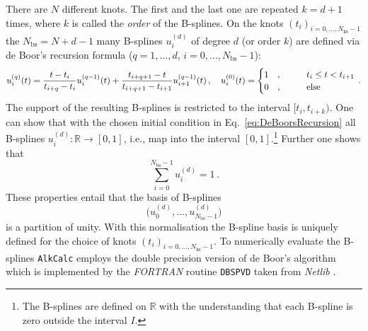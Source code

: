\documentclass[fontsize=12pt,
               twoside=false,
               BCOR=0mm,
               DIV=14,
               overfullrule=false, %
               toc=bibliography,
               headinclude=true,
               footinclude=false]{scrartcl}
\numberwithin{equation}{section}
\newcommand{\alkcalc}{\texttt{AlkCalc} }
\begin{document}
    There are $N$ different knots. The first and the last one are repeated
    $k=d+1$ times, where $k$ is called the \emph{order} of the B-splines. On the
    knots $(t_i)_{i=0,\dots,N_\mathrm{ks}-1}$ the $N_\mathrm{bs}=N+d-1$ many
    B-splines $u^{(d)}_i$ of degree $d$ (or order $k$) are defined via de Boor's
    recursion formula \cite{deboor2001} ($q=1,\dots,d$,
    $i=0,\dots,N_\mathrm{bs}-1$):
    \begin{equation}\label{eq:DeBoorsRecursion}
        u^{(q)}_i(t)
        =
        \frac{t-t_i}{t_{i+q}-t_i}
        u^{(q-1)}_i(t)
        +
        \frac{t_{i+q+1}-t}{t_{i+q+1}-t_{i+1}}
        u^{(q-1)}_{i+1}(t)
    \,, \ \ \
        u^{(0)}_i(t)
        =
        \begin{cases}
            1
            &, \hspace*{10mm} t_i \leq t < t_{i+1}
        \\
            0
            &, \hspace*{10mm} \text{else}
        \end{cases}
    \,.
    \end{equation}
    The support of the resulting B-splines is restricted to the interval
    $[t_i,t_{i+k})$. One can show that with the chosen initial condition in
    Eq.~\eqref{eq:DeBoorsRecursion} all B-splines
    $u^{(d)}_i\colon\mathbb{R}\to[0,1]$, i.e., map into the interval
    $[0,1]$.\footnote{The B-splines are defined on $\mathbb{R}$ with the
    understanding that each B-spline is zero outside the interval $I$.} Further
    one shows that
    \begin{equation}
        \sum^{N_\mathrm{bs}-1}_{i=0} u^{(d)}_i = 1
    \,.
    \end{equation}
    These properties entail that the basis of B-splines
    \begin{equation}
        \big(
            u^{(d)}_0, \dots, u^{(d)}_{N_\mathrm{bs}-1}
        \big)
    \end{equation}
    is a partition of unity. With this normalisation the B-spline basis is
    uniquely defined for the choice of knots
    $(t_i)_{i=0,\dots,N_\mathrm{ks}-1}$. To numerically evaluate the B-splines
    \alkcalc employs the double precision version of de Boor's algorithm which
    is implemented by the \emph{FORTRAN} routine \texttt{DBSPVD} \cite{amos1993}
    taken from \emph{Netlib}
    \cite{dongarra1987}.
\end{document}
